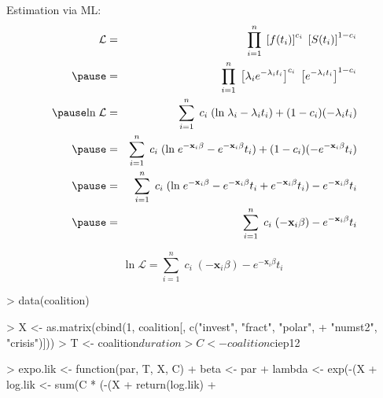 \documentclass{beamer}
\begin{document}
\begin{frame}
Estimation via ML:
\pause
\begin{eqnarray*}
\mathcal{L} &=& \prod^n_{i=1} \; \left[ f(t_i) \right] ^
{c_i} \; \left[ S(t_i) \right] ^ {1 - c_i} \\  
\pause 
&=&  \prod^n_{i=1} \; \left[ \lambda_i e^{-\lambda_i t_i} \right] ^{c_i}
\; \left[ e^{-\lambda_i t_i} \right] ^ {1 - c_i}\\
\pause
\mathrm{ln} \; \mathcal{L} &=& \sum_{i=1}^n \; c_i \; (\mathrm{ln} \;
\lambda_i - \lambda_i t_i) + (1-c_i) (-\lambda_i t_i) \\
\pause
&=& \sum_{i=1}^n \; c_i \; (\mathrm{ln} \;
e^{-\mathbf{x}_i \beta} - e^{-\mathbf{x}_i \beta} t_i) + (1-c_i) (-e^{-\mathbf{x}_i \beta} t_i) \\
\pause
&=& \sum_{i=1}^n \; c_i \; (\mathrm{ln} \;
e^{-\mathbf{x}_i \beta} - e^{-\mathbf{x}_i \beta} t_i +
e^{-\mathbf{x}_i \beta} t_i) - e^{-\mathbf{x}_i \beta} t_i\\
\pause
&=& \sum_{i=1}^n \; c_i \; (-\mathbf{x}_i \beta) - e^{-\mathbf{x}_i \beta} t_i\\
\end{eqnarray*}
\end{frame}

\begin{frame}[fragile]
\begin{equation*}
\mathrm{ln} \; \mathcal{L} = \sum_{i=1}^n \; c_i \; (-\mathbf{x}_i \beta) - e^{-\mathbf{x}_i \beta} t_i
\end{equation*}
\pause
\tiny{
\begin{Schunk}
\begin{Sinput}
> data(coalition)
\end{Sinput}
\end{Schunk}
\begin{Schunk}
\begin{Sinput}
> X <- as.matrix(cbind(1, coalition[, c("invest", "fract", "polar", 
+     "numst2", "crisis")]))
> T <- coalition$duration
> C <- coalition$ciep12
\end{Sinput}
\end{Schunk}
\pause
\begin{Schunk}
\begin{Sinput}
> expo.lik <- function(par, T, X, C) {
+     beta <- par
+     lambda <- exp(-(X %
+     log.lik <- sum(C * (-(X %
+     return(log.lik)
+ }
\end{Sinput}
\end{Schunk}
\pause
\begin{Schunk}
\end{Schunk}
}
\end{frame}
\end{document}
